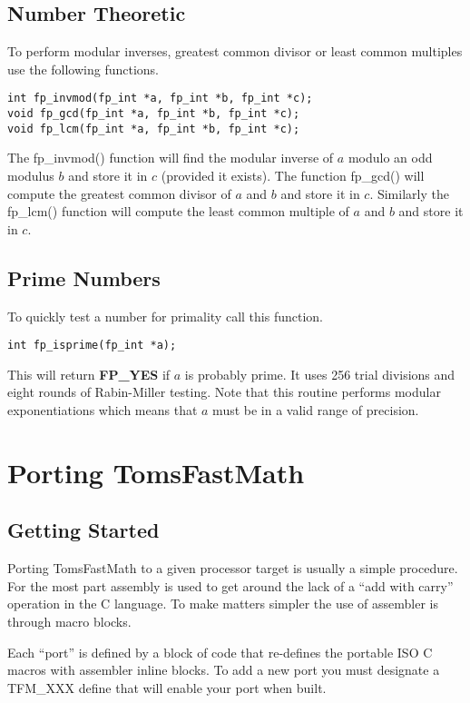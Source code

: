 \documentclass[b5paper]{book}
\begin{document}
\section{Number Theoretic}

To perform modular inverses, greatest common divisor or least common multiples use the following
functions.

  
\begin{verbatim}
int fp_invmod(fp_int *a, fp_int *b, fp_int *c);
void fp_gcd(fp_int *a, fp_int *b, fp_int *c);
void fp_lcm(fp_int *a, fp_int *b, fp_int *c);
\end{verbatim}

The fp\_invmod() function will find the modular inverse of $a$ modulo an odd modulus $b$ and store
it in $c$ (provided it exists).  The function fp\_gcd() will compute the greatest common
divisor of $a$ and $b$ and store it in $c$.  Similarly the fp\_lcm() function will compute
the least common multiple of $a$ and $b$ and store it in $c$.

\section{Prime Numbers}
To quickly test a number for primality call this function.

\begin{verbatim}
int fp_isprime(fp_int *a);
\end{verbatim}
This will return \textbf{FP\_YES} if $a$ is probably prime.  It uses 256 trial divisions and
eight rounds of Rabin-Miller testing.  Note that this routine performs modular exponentiations
which means that $a$ must be in a valid range of precision.

\chapter{Porting TomsFastMath}
\label{chap:asmops}
\section{Getting Started}
Porting TomsFastMath to a given processor target is usually a simple procedure.  For the most part 
assembly is used to get around the lack of a ``add with carry'' operation in the C language.  To
make matters simpler the use of assembler is through macro blocks.

Each ``port'' is defined by a block of code that re-defines the portable ISO C macros with assembler
inline blocks.  To add a new port you must designate a TFM\_XXX define that will enable your 
port when built.
\end{document}
